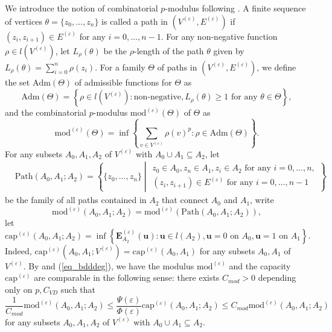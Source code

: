 \documentclass[11pt,a4paper]{article}
\numberwithin{equation}{section}
\theoremstyle{plain}
\theoremstyle{definition}
\begin{document}
We introduce the notion of combinatorial $p$-modulus following \cite[Section 2]{MS25}. A finite sequence of vertices $\theta=\{z_0,\ldots,z_n\}$ is called a path in $(V^{(\varepsilon)},E^{(\varepsilon)})$ if $(z_{i},z_{i+1})\in E^{(\varepsilon)}$ for any $i=0,\ldots,n-1$. For any non-negative function $\rho\in l(V^{(\varepsilon)})$, let $L_\rho(\theta)$ be the $\rho$-length of the path $\theta$ given by $L_\rho(\theta)=\sum_{i=0}^n\rho(z_i)$. For a family $\Theta$ of paths in $(V^{(\varepsilon)},E^{(\varepsilon)})$, we define the set $\mathrm{Adm}(\Theta)$ of admissible functions for $\Theta$ as
$$\mathrm{Adm}(\Theta)=\left\{\rho\in l(V^{(\varepsilon)}):\text{non-negative},L_\rho(\theta)\ge1\text{ for any }\theta\in\Theta\right\},$$
and the combinatorial $p$-modulus $\mathrm{mod}^{(\varepsilon)}(\Theta)$ of $\Theta$ as
$$\mathrm{mod}^{(\varepsilon)}(\Theta)=\inf \left\{\sum_{v\in V^{(\varepsilon)}}\rho(v)^p:\rho\in\mathrm{Adm}(\Theta)\right\}.$$
For any subsets $A_0, A_1, A_2$ of $V^{(\varepsilon)}$ with $A_0\cup A_1\subseteq A_2$, let
\begin{align*}
&\mathrm{Path}(A_0,A_1;A_2)=\left\{\{z_0,\ldots,z_n\}\middle|
\begin{array}{l}
z_0\in A_0,z_n\in A_1,z_i\in A_2\text{ for any }i=0,\ldots,n,\\
(z_i,z_{i+1})\in E^{(\varepsilon)}\text{ for any }i=0,\ldots,n-1
\end{array}
\right\}
\end{align*}
be the family of all paths contained in $A_2$ that connect $A_0$ and $A_1$, write 
$$\mathrm{mod}^{(\varepsilon)}(A_0,A_1;A_2)=\mathrm{mod}^{(\varepsilon)}\left(\mathrm{Path}(A_0,A_1;A_2)\right),$$
let
$$\mathrm{cap}^{(\varepsilon)}(A_0,A_1;A_2)=\inf\left\{\mathbf{E}^{(\varepsilon)}_{A_2}(\mathbf{u}):\mathbf{u}\in l(A_2),\mathbf{u}=0\text{ on }A_0,\mathbf{u}=1\text{ on }A_1\right\}.$$
Indeed, $\mathrm{cap}^{(\varepsilon)}(A_0,A_1;V^{(\varepsilon)})=\mathrm{cap}^{(\varepsilon)}(A_0,A_1)$ for any subsets $A_0, A_1$ of $V^{(\varepsilon)}$. By \cite[Lemma 2.12]{MS25} and (\ref{eq_bdddeg}), we have the modulus $\mathrm{mod}^{(\varepsilon)}$ and the capacity $\mathrm{cap}^{(\varepsilon)}$ are comparable in the following sense: there exists $C_{mod}>0$ depending only on $p,C_{VD}$ such that
$$\frac{1}{C_{mod}}\mathrm{mod}^{(\varepsilon)}(A_0,A_1;A_2)\le \frac{\Psi(\varepsilon)}{\Phi(\varepsilon)}\mathrm{cap}^{(\varepsilon)}(A_0,A_1;A_2)\le {C_{mod}}\mathrm{mod}^{(\varepsilon)}(A_0,A_1;A_2)$$
for any subsets $A_0, A_1, A_2$ of $V^{(\varepsilon)}$ with $A_0\cup A_1\subseteq A_2$.
\end{document}
